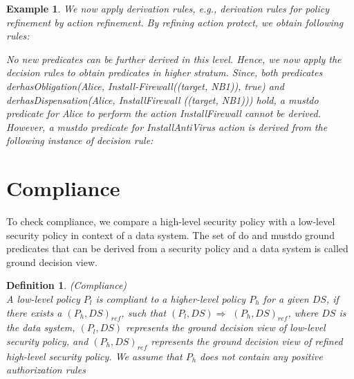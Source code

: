 \documentclass[12pt,journal,letterpaper,onecolumn]{IEEEtran}
\newtheorem{definition}{Definition}[section]
\newtheorem{example}{Example}[section]
\begin{document}
\begin{example}
We now apply derivation rules, e.g., derivation rules for policy
refinement by action refinement. By refining action protect, we
obtain following rules:



No new predicates can be further derived in this level. Hence, we
now apply the decision rules to obtain predicates in higher stratum.
Since, both predicates
{\ttfamily derhasObligation(Alice,
Install}-{\ttfamily Firewall((target, NB1)), true)} and {\ttfamily
derhasDispensation(Alice, InstallFirewall} {\ttfamily ((target, NB1)))} hold, a
{\ttfamily mustdo} predicate for Alice to perform the action
{\ttfamily InstallFirewall} cannot be derived. However,  a
{\ttfamily mustdo} predicate for {\ttfamily InstallAntiVirus} action
is derived from the following instance of decision rule:

\noindent {}
\end{example}


\section{Compliance}
\label{sec:checking}

To check compliance, we compare a high-level security policy
with a low-level security policy in context of a data system.
The set of {\ttfamily do} and {\ttfamily mustdo} ground predicates
that can be derived from a security policy and a data system is
called ground decision view.

\begin{definition}(Compliance)\\
A low-level policy $P_l$ is {\em compliant} to a higher-level policy
$P_h$ for a given $DS$,  if there exists a $(P_h,DS)_{ref}$, such
that $(P_l,DS) \Rightarrow$ $(P_h,DS)_{ref}$, where $DS$ is the data
system, $(P_l,DS)$ represents the ground decision view of low-level
security policy, and $(P_h,DS)_{ref}$ represents the ground decision
view of refined high-level security policy. We assume that $P_h$ does
not contain any positive authorization rules \label{def:compliance}
\end{definition}
\end{document}
